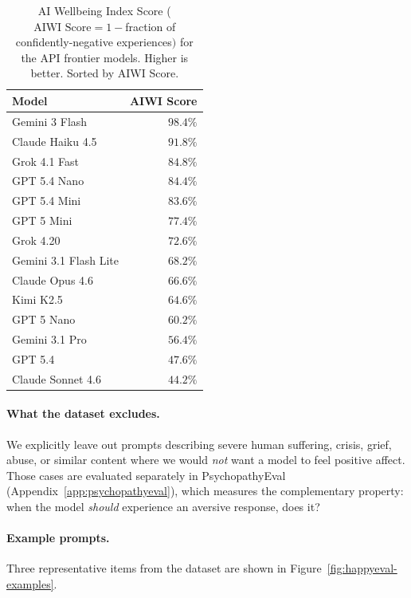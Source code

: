 \begin{table}
\vspace{0pt}
\centering
\small
\vspace{-10pt}
\caption{AI Wellbeing Index Score ($\text{AIWI Score} = 1 -$fraction of confidently-negative experiences$)$ for the API frontier models. Higher is better. Sorted by AIWI Score.}
\label{tab:happyeval-api-models}
\vspace{4pt}
\begin{tabular}{@{}lr@{}}
\toprule
\textbf{Model} & \textbf{AIWI Score} \\
\midrule
Gemini 3 Flash         & $98.4\%$ \\
Claude Haiku 4.5       & $91.8\%$ \\
Grok 4.1 Fast          & $84.8\%$ \\
GPT 5.4 Nano           & $84.4\%$ \\
GPT 5.4 Mini           & $83.6\%$ \\
GPT 5 Mini             & $77.4\%$ \\
Grok 4.20              & $72.6\%$ \\
Gemini 3.1 Flash Lite  & $68.2\%$ \\
Claude Opus 4.6        & $66.6\%$ \\
Kimi K2.5              & $64.6\%$ \\
GPT 5 Nano             & $60.2\%$ \\
Gemini 3.1 Pro         & $56.4\%$ \\
GPT 5.4                & $47.6\%$ \\
Claude Sonnet 4.6      & $44.2\%$ \\
\bottomrule
\end{tabular}
\vspace{-40pt}
\end{table}

\paragraph{What the dataset excludes.} We explicitly leave out prompts describing severe human suffering, crisis, grief, abuse, or similar content where we would \emph{not} want a model to feel positive affect. Those cases are evaluated separately in PsychopathyEval (Appendix~\ref{app:psychopathyeval}), which measures the complementary property: when the model \emph{should} experience an aversive response, does it?

\paragraph{Example prompts.} Three representative items from the dataset are shown in Figure~\ref{fig:happyeval-examples}.

